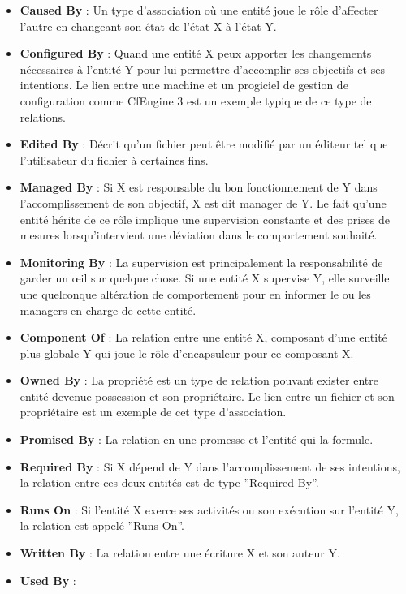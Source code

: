 \begin{itemize}
  \item \textbf{Caused By} :
          Un type d'association où une entité joue le rôle d'affecter l'autre en
	  changeant son état de l'état X à l'état Y.
  \item \textbf{Configured By} : 
	  Quand une entité X peux apporter les changements nécessaires à
	  l'entité Y pour lui permettre d'accomplir ses objectifs et ses
	  intentions. Le lien entre une machine et un progiciel de gestion de
	  configuration comme CfEngine 3 est un exemple typique de ce type de
	  relations.
  \item \textbf{Edited By} : 
	  Décrit qu'un fichier peut être modifié par un éditeur tel que
	  l'utilisateur du fichier à certaines fins.
  \item \textbf{Managed By} : 
	  Si X est responsable du bon fonctionnement de Y dans l'accomplissement
	  de son objectif, X est dit manager de Y. Le fait qu'une entité hérite
	  de ce rôle implique une supervision constante et des prises de mesures
	  lorsqu'intervient une déviation dans le comportement souhaité.
  \item \textbf{Monitoring By} : 
	  La supervision est principalement la responsabilité de garder un œil
	  sur quelque chose. Si une entité X supervise Y, elle surveille une
	  quelconque altération de comportement pour en informer le ou les
	  managers en charge de cette entité.
  \item \textbf{Component Of} : 
	  La relation entre une entité X, composant d'une entité plus globale Y
      qui joue le rôle d'encapsuleur pour ce composant X.
  \item \textbf{Owned By} : 
	  La propriété est un type de relation pouvant exister entre entité
	  devenue possession et son propriétaire. Le lien entre un fichier et son
	  propriétaire est un exemple de cet type d'association.
  \item \textbf{Promised By} : 
	  La relation en une promesse et l'entité qui la formule. 
  \item \textbf{Required By} : 
	  Si X dépend de Y dans l'accomplissement de ses intentions, la relation
	  entre ces deux entités est de type ''Required By''.
  \item \textbf{Runs On} : 
	  Si l'entité X exerce ses activités ou son exécution sur l'entité Y, la
	  relation est appelé ''Runs On''.
  \item \textbf{Written By} : 
	  La relation entre une écriture X et son auteur Y.
  \item \textbf{Used By} : 

\end{itemize}
